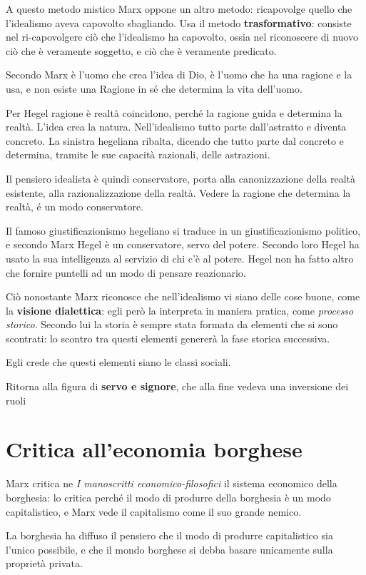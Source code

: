 \documentclass[a4paper, twoside, titlepage]{book}
\begin{document}
A questo metodo mistico Marx oppone un altro metodo: ricapovolge quello che l'idealismo aveva capovolto sbagliando. Usa il metodo \textbf{trasformativo}: consiste nel ri-capovolgere ciò che l'idealismo ha capovolto, ossia nel riconoscere di nuovo ciò che è veramente soggetto, e ciò che è veramente predicato.

Secondo Marx è l'uomo che crea l'idea di Dio, è l'uomo che ha una ragione e la usa, e non esiste una Ragione in sé che determina la vita dell'uomo.

Per Hegel ragione è realtà coincidono, perché la ragione guida e determina la realtà. L'idea crea la natura.
Nell'idealismo tutto parte dall'astratto e diventa concreto.
La sinistra hegeliana ribalta, dicendo che tutto parte dal concreto e determina, tramite le sue capacità razionali, delle astrazioni.

Il pensiero idealista è quindi conservatore, porta alla canonizzazione della realtà esistente, alla razionalizzazione della realtà. Vedere la ragione che determina la realtà, é un modo conservatore.

Il famoso giustificazionismo hegeliano si traduce in un giustificazionismo politico, e secondo Marx Hegel è un conservatore, servo del potere.
Secondo loro Hegel ha usato la sua intelligenza al servizio di chi c'è al potere.
Hegel non ha fatto altro che fornire puntelli ad un modo di pensare reazionario.

Ciò nonostante Marx riconosce che nell'idealismo vi siano delle cose buone, come la \textbf{visione dialettica}: egli però la interpreta in maniera pratica, come \textit{processo storico}.
Secondo lui la storia è sempre stata formata da elementi che si sono scontrati: lo scontro tra questi elementi genererà la fase storica successiva.

Egli crede che questi elementi siano le classi sociali.

Ritorna alla figura di \textbf{servo e signore}, che alla fine vedeva una inversione dei ruoli

\chapter{Critica all'economia borghese}

Marx critica ne \textit{I manoscritti economico-filosofici} il sistema economico della borghesia: lo critica perché il modo di produrre della borghesia è un modo capitalistico, e Marx vede il capitalismo come il suo grande nemico.

La borghesia ha diffuso il pensiero che il modo di produrre capitalistico sia l'unico possibile, e che il mondo borghese si debba basare unicamente sulla proprietà privata.
\end{document}

